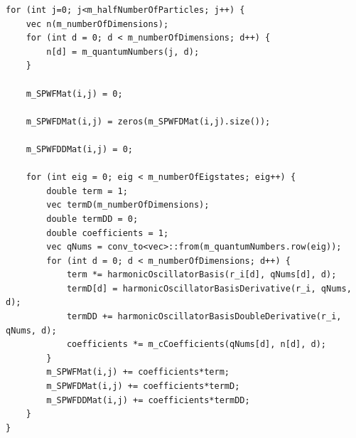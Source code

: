 \documentclass[../main.tex]{subfiles}
\begin{document}
\lstset{language=c++}
\begin{lstlisting}[caption={Loop updating the Slater matrices when the single particle wave functions are expanded in a basis of harmonic oscillator functions. $i$ is the index of the particle that was moved in the current Metropolis step, while $r\_i$ is the position of that particle. We need an additional loop over basis functions compared to if we use closed form expressions for the single particle wave functions. We need two quantum number variables, one for the basis functions, and one which corresponds to the single particle wave function we're trying to approximate.}]
for (int j=0; j<m_halfNumberOfParticles; j++) {
    vec n(m_numberOfDimensions);
    for (int d = 0; d < m_numberOfDimensions; d++) {
        n[d] = m_quantumNumbers(j, d);
    }

    m_SPWFMat(i,j) = 0;

    m_SPWFDMat(i,j) = zeros(m_SPWFDMat(i,j).size());

    m_SPWFDDMat(i,j) = 0;

    for (int eig = 0; eig < m_numberOfEigstates; eig++) {
        double term = 1;
        vec termD(m_numberOfDimensions);
        double termDD = 0;
        double coefficients = 1;
        vec qNums = conv_to<vec>::from(m_quantumNumbers.row(eig));
        for (int d = 0; d < m_numberOfDimensions; d++) {
            term *= harmonicOscillatorBasis(r_i[d], qNums[d], d);
            termD[d] = harmonicOscillatorBasisDerivative(r_i, qNums, d);
            termDD += harmonicOscillatorBasisDoubleDerivative(r_i, qNums, d);
            coefficients *= m_cCoefficients(qNums[d], n[d], d);
        }
        m_SPWFMat(i,j) += coefficients*term;
        m_SPWFDMat(i,j) += coefficients*termD;
        m_SPWFDDMat(i,j) += coefficients*termDD;
    }
}
\end{lstlisting}
\end{document}

